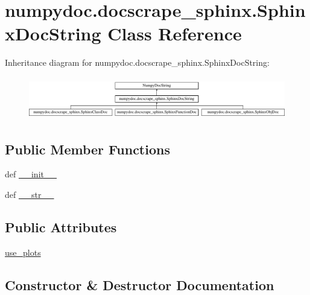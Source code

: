 \hypertarget{classnumpydoc_1_1docscrape__sphinx_1_1SphinxDocString}{}\section{numpydoc.\+docscrape\+\_\+sphinx.\+Sphinx\+Doc\+String Class Reference}
\label{classnumpydoc_1_1docscrape__sphinx_1_1SphinxDocString}
Inheritance diagram for numpydoc.\+docscrape\+\_\+sphinx.\+Sphinx\+Doc\+String\+:\begin{figure}[H]
\begin{center}
\leavevmode
\includegraphics[height=1.872910cm]{classnumpydoc_1_1docscrape__sphinx_1_1SphinxDocString}
\end{center}
\end{figure}
\subsection*{Public Member Functions}
\begin{DoxyCompactItemize}
\item 
def \hyperlink{classnumpydoc_1_1docscrape__sphinx_1_1SphinxDocString_a5b30e7876c7c45c5f5ba54ffe618e9cc}{\+\_\+\+\_\+init\+\_\+\+\_\+}
\item 
def \hyperlink{classnumpydoc_1_1docscrape__sphinx_1_1SphinxDocString_a365d10e4b9292e41dbfecda9d323dd09}{\+\_\+\+\_\+str\+\_\+\+\_\+}
\end{DoxyCompactItemize}
\subsection*{Public Attributes}
\begin{DoxyCompactItemize}
\item 
\hyperlink{classnumpydoc_1_1docscrape__sphinx_1_1SphinxDocString_a49bd19755dc2089b58e5b8f9915f3c75}{use\+\_\+plots}
\end{DoxyCompactItemize}


\subsection{Constructor \& Destructor Documentation}
\hypertarget{classnumpydoc_1_1docscrape__sphinx_1_1SphinxDocString_a5b30e7876c7c45c5f5ba54ffe618e9cc}{}
